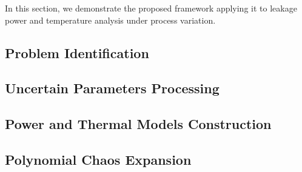 In this section, we demonstrate the proposed framework applying it to leakage power and temperature analysis under process variation.

\subsection{Problem Identification} 


\subsection{Uncertain Parameters Processing} 


\subsection{Power and Thermal Models Construction} 


\subsection{Polynomial Chaos Expansion} 

